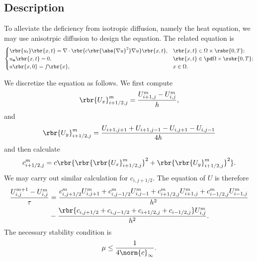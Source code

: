 \documentclass[english, nochinese]{pnote}
\begin{document}
\subsection{Description}

To alleviate the deficiency from isotropic diffusion, namely the heat equation, we may use anisotrpic diffusion to design the equation. The related equation is
\begin{equation}
\begin{cases}
\rbr{u_t} \rbr{ x, t } = \nabla \cdot \rbr{ c \rbr{\abs{ \nabla u }^2} \nabla u } \rbr{ x, t }, & \rbr{ x, t } \in \Omega \times \rsbr{ 0, T }; \\
u_{\mathbf{n}} \rbr{ x, t } = 0, & \rbr{ x, t } \in \pd \Omega \times \rsbr{ 0, T }; \\
u \rbr{ x, 0 } = f \rbr{x}, & x \in \Omega.
\end{cases}
\end{equation}

We discretize the equation as follows. We first compute
\begin{equation}
\rbr{U_x}_{ i + 1 / 2, j }^m = \frac{ U_{ i + 1 , j }^m - U_{ i, j }^m }{h},
\end{equation}
and
\begin{equation}
\rbr{U_y}_{ i + 1 / 2, j }^m = \frac{ U_{ i + 1, j + 1 } + U_{ i + 1, j - 1 } - U_{ i, j + 1 } - U_{ i, j - 1 } }{ 4 h }
\end{equation}
and then calculate
\begin{equation}
c_{ i + 1 / 2, j }^m = c \rbr{ \rbr{\rbr{U_x}_{ i + 1 / 2, j }^m}^2 + \rbr{\rbr{U_y}_{ i + 1 / 2, j }^m}^2 }.
\end{equation}
We may carry out similar calculation for $c_{ i, j + 1 / 2 } $. The equation of $U$ is therefore
\begin{equation}
\begin{split}
\frac{ U_{ i, j }^{ m + 1 } - U_{ i, j }^m }{\tau} &= \frac{ c_{ i, j + 1 / 2 }^m U_{ i, j + 1 }^m + c_{ i, j - 1 / 2 }^m U_{ i, j - 1 }^m + c_{ i + 1 / 2, j }^m U_{ i + 1, j }^m + c_{ i - 1 / 2, j }^m U_{ i - 1, j }^m }{h^2} \\
&- \frac{ \rbr{ c_{ i, j + 1 / 2 } + c_{ i, j - 1 / 2 } + c_{ i + 1 / 2, j } + c_{ i - 1 / 2, j } } U_{ i, j }^m }{h^2}.
\end{split}
\end{equation}
The necessary stability condition is
\begin{equation}
\mu \le \frac{1}{ 4 \norm{c}_{\infty} }.
\end{equation}
\end{document}
